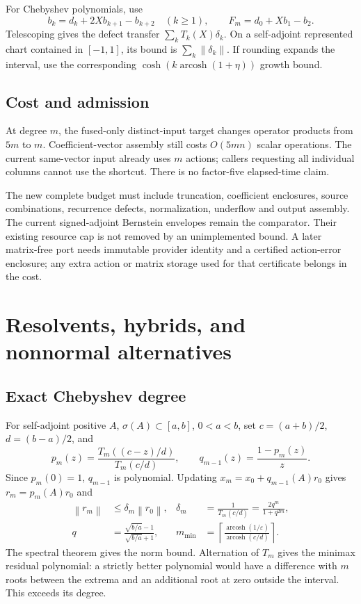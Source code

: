 \documentclass[aps,pra,reprint,onecolumn,11pt,notitlepage,nofootinbib]{revtex4-2}
\newcommand{\norm}[1]{\left\|#1\right\|}
\newcommand{\eps}{\varepsilon}
\begin{document}
For Chebyshev polynomials, use
\begin{equation}
 b_k=d_k+2Xb_{k+1}-b_{k+2}\quad(k\ge1),\qquad
 F_m=d_0+Xb_1-b_2.
\end{equation}
Telescoping gives the defect transfer $\sum_k T_k(X)\delta_k$. On a
self-adjoint represented chart contained in $[-1,1]$, its bound is
$\sum_k\norm{\delta_k}$. If rounding expands the interval, use the
corresponding $\cosh(k\operatorname{arcosh}(1+\eta))$ growth bound.

\subsection{Cost and admission}
At degree $m$, the fused-only distinct-input target changes operator products
from $5m$ to $m$. Coefficient-vector assembly still costs $O(5mn)$ scalar
operations. The current same-vector input already uses $m$ actions; callers
requesting all individual columns cannot use the shortcut. There is no
factor-five elapsed-time claim.

The new complete budget must include truncation, coefficient enclosures,
source combinations, recurrence defects, normalization, underflow and output
assembly. The current signed-adjoint Bernstein envelopes remain the
comparator. Their existing resource cap is not removed by an unimplemented
bound. A later matrix-free port needs immutable provider identity and a
certified action-error enclosure; any extra action or matrix storage used
for that certificate belongs in the cost.

\section{Resolvents, hybrids, and nonnormal alternatives}
\subsection{Exact Chebyshev degree}
For self-adjoint positive $A$, $\sigma(A)\subset[a,b]$, $0<a<b$, set
$c=(a+b)/2$, $d=(b-a)/2$, and
\begin{equation}
 p_m(z)=\frac{T_m((c-z)/d)}{T_m(c/d)},\qquad
 q_{m-1}(z)=\frac{1-p_m(z)}{z}.
\end{equation}
Since $p_m(0)=1$, $q_{m-1}$ is polynomial. Updating
$x_m=x_0+q_{m-1}(A)r_0$ gives $r_m=p_m(A)r_0$ and
\begin{align}
 \norm{r_m}&\le\delta_m\norm{r_0}, &
 \delta_m&=\frac{1}{T_m(c/d)}=\frac{2q^m}{1+q^{2m}},\\
 q&=\frac{\sqrt{b/a}-1}{\sqrt{b/a}+1}, &
 m_{\min}&=\left\lceil\frac{\operatorname{arcosh}(1/\eps)}
 {\operatorname{arcosh}(c/d)}\right\rceil .
\end{align}
The spectral theorem gives the norm bound. Alternation of $T_m$ gives the
minimax residual polynomial: a strictly better polynomial would have a
difference with $m$ roots between the extrema and an additional root at
zero outside the interval. This exceeds its degree.
\end{document}
